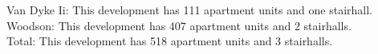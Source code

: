 {Van Dyke Ii}: This development has 111 apartment units and one stairhall.\\{Woodson}: This development has 407 apartment units and 2 stairhalls.\\{Total}: This development has 518 apartment units and 3 stairhalls.\\